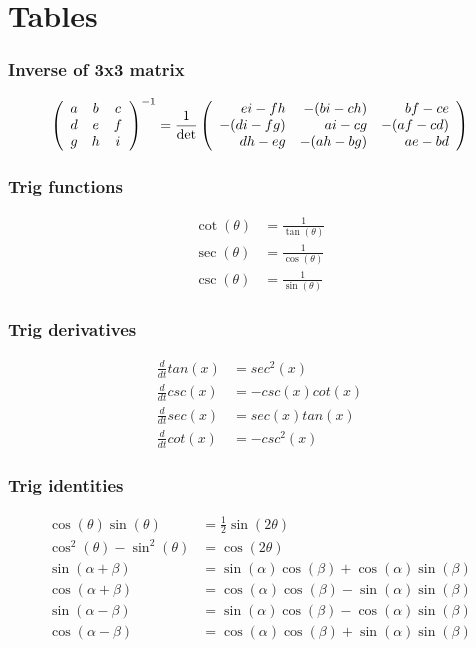 \part{Tables}

\section{Inverse of 3x3 matrix}
\begin{equation}
\left(\begin{array}{ccc}
    a & b & c\\
    d & e & f\\
    g & h &i
\end{array}\right)^{-1}
=
{\frac{1}{\rm{det}}}
\left(\begin{array}{rrr}
    e i - f h & -(b i - c h) & b f - c e\\
    -(d i - f g) & a i - c g & -(a f -c d)\\
    d h - e g & -(a h - b g) & a e - b d
\end{array}\right)
\end{equation}


\section{Trig functions}
\begin{align}
    \cot(\theta) &= \frac{1}{\tan(\theta)}\\
    \sec(\theta) &= \frac{1}{\cos(\theta)}\\
    \csc(\theta) &= \frac{1}{\sin(\theta)}
\end{align}

\section{Trig derivatives}
\begin{align}
    \frac{d}{dt}tan(x) &= sec^2(x) \\
    \frac{d}{dt}csc(x) &= -csc(x)cot(x) \\
    \frac{d}{dt}sec(x) &= sec(x)tan(x) \\
    \frac{d}{dt}cot(x) &= -csc^2(x)
\end{align}



\section{Trig identities}
\begin{align}
    \cos(\theta)\sin(\theta) &= \frac{1}{2}\sin(2\theta)\\
    \cos^2(\theta)-\sin^2(\theta) &= \cos(2\theta)\\
    \sin(\alpha+\beta) &= \sin(\alpha)\cos(\beta) + \cos(\alpha)\sin(\beta)\\
    \cos(\alpha+\beta) &= \cos(\alpha)\cos(\beta) - \sin(\alpha)\sin(\beta)\\
    \sin(\alpha-\beta) &= \sin(\alpha)\cos(\beta) - \cos(\alpha)\sin(\beta)\\
    \cos(\alpha-\beta) &= \cos(\alpha)\cos(\beta) + \sin(\alpha)\sin(\beta)
\end{align}

